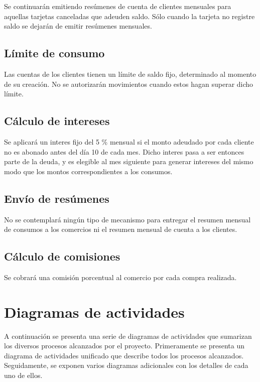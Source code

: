 Se continuarán emitiendo resúmenes de cuenta de clientes mensuales para aquellas
tarjetas canceladas que adeuden saldo. Sólo cuando la tarjeta no registre saldo
se dejarán de emitir resúmenes mensuales.

\subsection{Límite de consumo}

Las cuentas de los clientes tienen un límite de saldo fijo, determinado al momento de su creación. No se autorizarán movimientos cuando estos hagan superar dicho límite.

\subsection{Cálculo de intereses}

Se aplicará un interes fijo del 5 \% mensual si el monto adeudado por cada
cliente no es abonado antes del día 10 de cada mes. Dicho interes pasa a ser
entonces parte de la deuda, y es elegible al mes siguiente para generar
intereses del mismo modo que los montos correspondientes a los consumos.

\subsection{Envío de resúmenes}

No se contemplará ningún tipo de mecanismo para entregar el resumen mensual de
consumos a los comercios ni el resumen mensual de cuenta a los clientes.

\subsection{Cálculo de comisiones}

Se cobrará una comisión porcentual al comercio por cada compra realizada.

\section{Diagramas de actividades}

A continuación se presenta una serie de diagramas de actividades que sumarizan
los diversos procesos alcanzados por el proyecto. Primeramente se presenta un
diagrama de actividades unificado que describe todos los procesos alcanzados.
Seguidamente, se exponen varios diagramas adicionales con los detalles de cada
uno de ellos.

